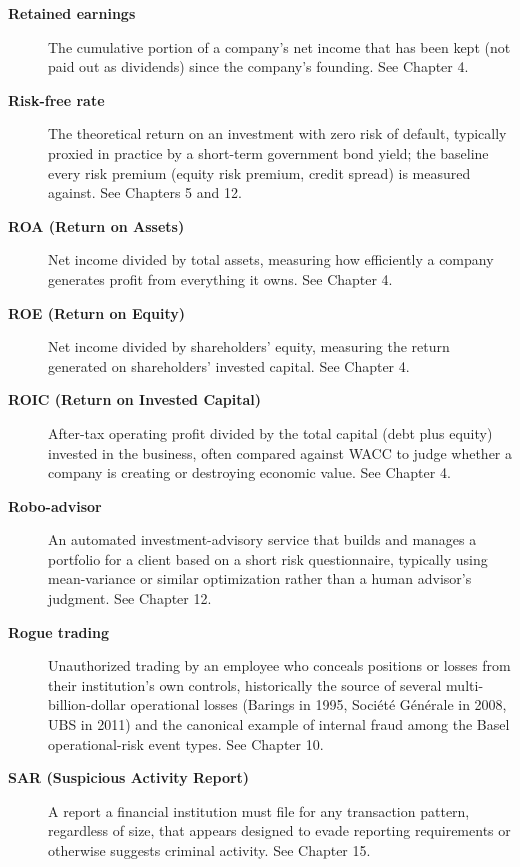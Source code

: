 \documentclass[../ai_in_finance]{subfiles}
\begin{document}
\begin{description}
\item[\textbf{Retained earnings}] The cumulative portion of a company's net income that has been kept (not paid out as dividends) since the company's founding. See Chapter 4.

\item[\textbf{Risk-free rate}] The theoretical return on an investment with zero risk of default, typically proxied in practice by a short-term government bond yield; the baseline every risk premium (equity risk premium, credit spread) is measured against. See Chapters 5 and 12.

\item[\textbf{ROA (Return on Assets)}] Net income divided by total assets, measuring how efficiently a company generates profit from everything it owns. See Chapter 4.

\item[\textbf{ROE (Return on Equity)}] Net income divided by shareholders' equity, measuring the return generated on shareholders' invested capital. See Chapter 4.

\item[\textbf{ROIC (Return on Invested Capital)}] After-tax operating profit divided by the total capital (debt plus equity) invested in the business, often compared against WACC to judge whether a company is creating or destroying economic value. See Chapter 4.

\item[\textbf{Robo-advisor}] An automated investment-advisory service that builds and manages a portfolio for a client based on a short risk questionnaire, typically using mean-variance or similar optimization rather than a human advisor's judgment. See Chapter 12.

\item[\textbf{Rogue trading}] Unauthorized trading by an employee who conceals positions or losses from their institution's own controls, historically the source of several multi-billion-dollar operational losses (Barings in 1995, Soci\'et\'e G\'en\'erale in 2008, UBS in 2011) and the canonical example of internal fraud among the Basel operational-risk event types. See Chapter 10.

\item[\textbf{SAR (Suspicious Activity Report)}] A report a financial institution must file for any transaction pattern, regardless of size, that appears designed to evade reporting requirements or otherwise suggests criminal activity. See Chapter 15.


\end{description}
\end{document}

